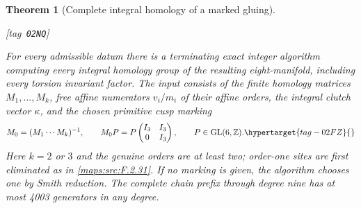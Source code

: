 \documentclass[11pt,a4paper]{article}
\numberwithin{equation}{section}
\newtheorem{theorem}{Theorem}[section]
\theoremstyle{definition}
\newcommand{\StatementRecord}[4]{{\upshape\footnotesize[tag~\texttt{#3}]}\enspace\ignorespaces}
\begin{document}
\begin{theorem}[Complete integral homology of a marked gluing]\hypertarget{tag-02NQ}{}\label{maps:src:F.2.35}
\StatementRecord{maps:src:F.2.35}{proved}{02NQ}{\cref{maps:src:F.2.31}, \cref{maps:src:F.2.33}, \cref{maps:src:F.2.34}}


For every admissible datum there is a terminating exact
integer algorithm computing every integral homology group of
the resulting eight-manifold, including every torsion invariant
factor.  The input consists of the finite homology matrices
$M_1,\ldots,M_k$, free affine numerators $v_i/m_i$ of their
affine orders, the integral clutch vector $\kappa$, and the
chosen primitive cusp marking
\begin{equation}
 M_0=(M_1\cdots M_k)^{-1},\qquad
 M_0P=P\begin{pmatrix}I_3&I_3\\0&I_3\end{pmatrix},
 \qquad P\in\mathrm{GL}(6,\mathbb Z).                       \hypertarget{tag-02FZ}{}\label{maps:eq:F.GC1}
\end{equation}
Here $k=2$ or $3$ and the genuine orders are at least two;
order-one sites are first eliminated as in \ref{maps:src:F.2.31}.
If no marking is given, the algorithm chooses one by Smith reduction.
The complete chain prefix through degree nine has at most
4003 generators in any degree.  

\end{theorem}
\end{document}
